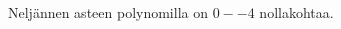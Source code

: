 \begin{esimerkki} Neljännen asteen polynomilla on $0--4$ nollakohtaa.
\begin{lukusuora}{-4}{4}{3.6}
\end{lukusuora}
\begin{lukusuora}{-4}{4}{3.6}
\end{lukusuora}
\begin{lukusuora}{-4}{4}{3.6}
\end{lukusuora}

\begin{lukusuora}{-4}{4}{3.6}
\end{lukusuora}
\begin{lukusuora}{-2.8}{2.8}{3.6}
\end{lukusuora}
\end{esimerkki}
